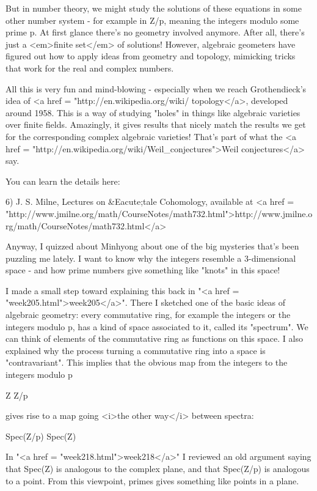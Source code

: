 But in number theory, we might study the solutions of these 
equations in some other number system - for example in Z/p, 
meaning the integers modulo some prime p.  At first glance there's 
no geometry involved anymore.  After all, there's just a <em>finite 
set</em> of solutions!  However, algebraic geometers have figured 
out how to apply ideas from geometry and topology, mimicking 
tricks that work for the real and complex numbers.  

All this is very fun and mind-blowing - especially when we reach
Grothendieck's idea of <a href =
"http://en.wikipedia.org/wiki/%
topology</a>, developed around 1958.  This is a way of studying
"holes" in things like algebraic varieties over finite
fields.  Amazingly, it gives results that nicely match the results we
get for the corresponding complex algebraic varieties!  That's part of
what the <a href =
"http://en.wikipedia.org/wiki/Weil_conjectures">Weil conjectures</a>
say.


You can learn the details here:

6) J. S. Milne, Lectures on &Eacute;tale Cohomology, available at
<a href = "http://www.jmilne.org/math/CourseNotes/math732.html">http://www.jmilne.org/math/CourseNotes/math732.html</a>

Anyway, I quizzed about Minhyong about one of the big mysteries
that's been puzzling me lately.  I want to know why the integers 
resemble a 3-dimensional space - and how prime numbers give something
like "knots" in this space!  

I made a small step toward explaining this back in "<a href =
"week205.html">week205</a>".  There I sketched one of the basic
ideas of algebraic geometry: every commutative ring, for example the
integers or the integers modulo p, has a kind of space associated to
it, called its "spectrum".  We can think of elements of the
commutative ring as functions on this space.  I also explained why the
process turning a commutative ring into a space is "contravariant".
This implies that the obvious map from the integers to the integers
modulo p

Z \to  Z/p

gives rise to a map going <i>the other way</i> between spectra:

Spec(Z/p) \to  Spec(Z)

In "<a href = "week218.html">week218</a>" I reviewed an
old argument saying that Spec(Z) is analogous to the complex
plane, and that Spec(Z/p) is analogous to a point.  
From this viewpoint, primes gives something like points in a plane.  

